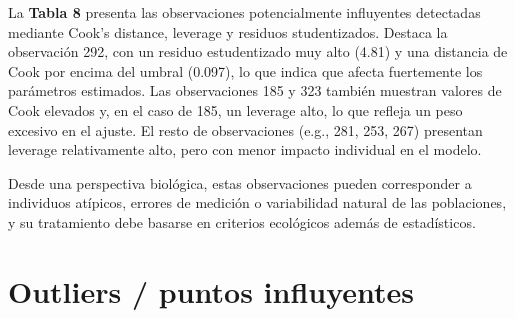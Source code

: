 \documentclass[
  spanish,
  11pt,
  a4paper,
  DIV=11,
  numbers=noendperiod]{scrartcl}
\begin{document}
La \textbf{Tabla 8} presenta las observaciones potencialmente
influyentes detectadas mediante Cook's distance, leverage y residuos
studentizados. Destaca la observación 292, con un residuo estudentizado
muy alto (4.81) y una distancia de Cook por encima del umbral (0.097),
lo que indica que afecta fuertemente los parámetros estimados. Las
observaciones 185 y 323 también muestran valores de Cook elevados y, en
el caso de 185, un leverage alto, lo que refleja un peso excesivo en el
ajuste. El resto de observaciones (e.g., 281, 253, 267) presentan
leverage relativamente alto, pero con menor impacto individual en el
modelo.

Desde una perspectiva biológica, estas observaciones pueden corresponder
a individuos atípicos, errores de medición o variabilidad natural de las
poblaciones, y su tratamiento debe basarse en criterios ecológicos
además de estadísticos.

\section{Outliers / puntos
influyentes}\label{outliers-puntos-influyentes}
\end{document}
